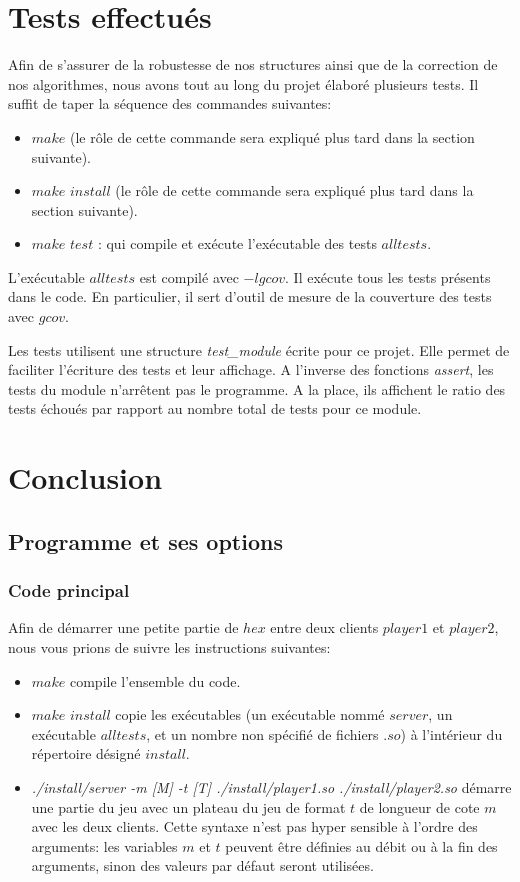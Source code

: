 \documentclass{article}
\begin{document}
\newpage

\section {Tests effectués}
Afin de s'assurer de la robustesse de nos structures ainsi que de la correction de nos algorithmes, nous avons tout au long du projet élaboré plusieurs tests. Il suffit de taper la séquence des commandes suivantes:
\begin{itemize}
    \item $make$ (le rôle de cette commande sera expliqué plus tard dans la section suivante).
    \item $make$ $install$ (le rôle de cette commande sera expliqué plus tard dans la section suivante).
    \item $make$ $test$ : qui compile et exécute l'exécutable des tests $alltests$.
\end{itemize}
 L'exécutable $alltests$ est compilé avec $-lgcov$. Il exécute tous les tests présents dans le code. En particulier, il sert d'outil de mesure de la couverture des tests avec $gcov$.
 
 Les tests utilisent une structure \textit{test\_module} écrite pour ce projet. Elle permet de faciliter l'écriture des tests et leur affichage. A l'inverse des fonctions \textit{assert}, les tests du module n'arrêtent pas le programme. A la place, ils affichent le ratio des tests échoués par rapport au nombre total de tests pour ce module.
 
\section{Conclusion }
\subsection{Programme et ses options}
\subsubsection{Code principal}
Afin de démarrer une petite partie de $hex$ entre deux clients $player1$ et $player2$, nous vous prions de suivre les instructions suivantes:
\begin{itemize}
    \item $make$ compile l'ensemble du code.
    \item $make$ $install$ copie les exécutables (un exécutable nommé $server$, un exécutable $alltests$, et un nombre non spécifié de fichiers $.so$) à l'intérieur du répertoire désigné $install$.
    \item \textit{./install/server -m [M] -t [T] ./install/player1.so ./install/player2.so} démarre une partie du jeu avec un plateau du jeu de format $t$ de longueur de cote $m$ avec les deux clients. Cette syntaxe n'est pas hyper sensible à l'ordre des arguments: les variables $m$ et $t$ peuvent être définies au débit ou à la fin des arguments, sinon des valeurs par défaut seront utilisées.
\end{itemize}
\end{document}
